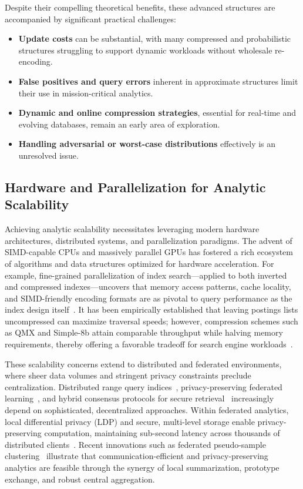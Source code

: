 \documentclass[11pt]{article}
\begin{document}
Despite their compelling theoretical benefits, these advanced structures are accompanied by significant practical challenges:
\begin{itemize}
    \item \textbf{Update costs} can be substantial, with many compressed and probabilistic structures struggling to support dynamic workloads without wholesale re-encoding.
    \item \textbf{False positives and query errors} inherent in approximate structures limit their use in mission-critical analytics.
    \item \textbf{Dynamic and online compression strategies}, essential for real-time and evolving databases, remain an early area of exploration.
    \item \textbf{Handling adversarial or worst-case distributions} effectively is an unresolved issue.
\end{itemize}

\subsection{Hardware and Parallelization for Analytic Scalability}

Achieving analytic scalability necessitates leveraging modern hardware architectures, distributed systems, and parallelization paradigms. The advent of SIMD-capable CPUs and massively parallel GPUs has fostered a rich ecosystem of algorithms and data structures optimized for hardware acceleration. For example, fine-grained parallelization of index search—applied to both inverted and compressed indexes—uncovers that memory access patterns, cache locality, and SIMD-friendly encoding formats are as pivotal to query performance as the index design itself~\cite{ref16, ref18, ref32, ref49, ref94, ref96}. It has been empirically established that leaving postings lists uncompressed can maximize traversal speeds; however, compression schemes such as QMX and Simple-8b attain comparable throughput while halving memory requirements, thereby offering a favorable tradeoff for search engine workloads~\cite{ref94}.

These scalability concerns extend to distributed and federated environments, where sheer data volumes and stringent privacy constraints preclude centralization. Distributed range query indices~\cite{ref39}, privacy-preserving federated learning~\cite{ref15, ref19}, and hybrid consensus protocols for secure retrieval~\cite{ref17} increasingly depend on sophisticated, decentralized approaches. Within federated analytics, local differential privacy (LDP) and secure, multi-level storage enable privacy-preserving computation, maintaining sub-second latency across thousands of distributed clients~\cite{ref19}. Recent innovations such as federated pseudo-sample clustering~\cite{ref20} illustrate that communication-efficient and privacy-preserving analytics are feasible through the synergy of local summarization, prototype exchange, and robust central aggregation.
\end{document}
